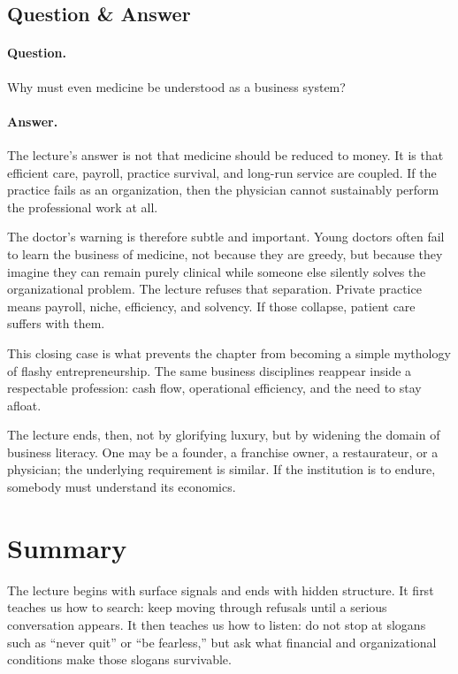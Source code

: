 \subsection{Question \& Answer}

\paragraph{Question.} Why must even medicine be understood as a business system?

\paragraph{Answer.} The lecture's answer is not that medicine should be reduced to money. It is that efficient care, payroll, practice survival, and long-run service are coupled. If the practice fails as an organization, then the physician cannot sustainably perform the professional work at all.

The doctor's warning is therefore subtle and important. Young doctors often fail to learn the business of medicine, not because they are greedy, but because they imagine they can remain purely clinical while someone else silently solves the organizational problem. The lecture refuses that separation. Private practice means payroll, niche, efficiency, and solvency. If those collapse, patient care suffers with them.

\begin{remark}
This closing case is what prevents the chapter from becoming a simple mythology of flashy entrepreneurship. The same business disciplines reappear inside a respectable profession: cash flow, operational efficiency, and the need to stay afloat.
\end{remark}

The lecture ends, then, not by glorifying luxury, but by widening the domain of business literacy. One may be a founder, a franchise owner, a restaurateur, or a physician; the underlying requirement is similar. If the institution is to endure, somebody must understand its economics.

\section{Summary}

The lecture begins with surface signals and ends with hidden structure. It first teaches us how to search: keep moving through refusals until a serious conversation appears. It then teaches us how to listen: do not stop at slogans such as ``never quit'' or ``be fearless,'' but ask what financial and organizational conditions make those slogans survivable.

